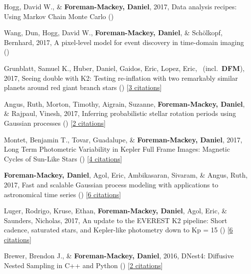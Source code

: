 \item[{\color{numcolor}\scriptsize10}] Hogg, David W., \& \textbf{Foreman-Mackey, Daniel}, 2017, Data analysis recipes: Using Markov Chain Monte Carlo ()

\item[{\color{numcolor}\scriptsize9}] Wang, Dun, Hogg, David W., \textbf{Foreman-Mackey, Daniel}, \& Sch{\"o}lkopf, Bernhard, 2017, A pixel-level model for event discovery in time-domain imaging ()

\item[{\color{numcolor}\scriptsize8}] Grunblatt, Samuel K., Huber, Daniel, Gaidos, Eric, Lopez, Eric, \etal\ (incl.\ \textbf{DFM}), 2017, Seeing double with K2: Testing re-inflation with two remarkably similar planets around red giant branch stars () [\href{http://adsabs.harvard.edu/abs/2017arXiv170605865G}{3 citations}]

\item[{\color{numcolor}\scriptsize7}] Angus, Ruth, Morton, Timothy, Aigrain, Suzanne, \textbf{Foreman-Mackey, Daniel}, \& Rajpaul, Vinesh, 2017, Inferring probabilistic stellar rotation periods using Gaussian processes () [\href{http://adsabs.harvard.edu/abs/2017arXiv170605459A}{2 citations}]

\item[{\color{numcolor}\scriptsize6}] Montet, Benjamin T., Tovar, Guadalupe, \& \textbf{Foreman-Mackey, Daniel}, 2017, Long Term Photometric Variability in Kepler Full Frame Images: Magnetic Cycles of Sun-Like Stars () [\href{http://adsabs.harvard.edu/abs/2017arXiv170507928M}{4 citations}]

\item[{\color{numcolor}\scriptsize5}] \textbf{Foreman-Mackey, Daniel}, Agol, Eric, Ambikasaran, Sivaram, \& Angus, Ruth, 2017, Fast and scalable Gaussian process modeling with applications to astronomical time series () [\href{http://adsabs.harvard.edu/abs/2017arXiv170309710F}{6 citations}]

\item[{\color{numcolor}\scriptsize4}] Luger, Rodrigo, Kruse, Ethan, \textbf{Foreman-Mackey, Daniel}, Agol, Eric, \& Saunders, Nicholas, 2017, An update to the EVEREST K2 pipeline: Short cadence, saturated stars, and Kepler-like photometry down to Kp = 15 () [\href{http://adsabs.harvard.edu/abs/2017arXiv170205488L}{6 citations}]

\item[{\color{numcolor}\scriptsize3}] Brewer, Brendon J., \& \textbf{Foreman-Mackey, Daniel}, 2016, DNest4: Diffusive Nested Sampling in C++ and Python () [\href{http://adsabs.harvard.edu/abs/2016arXiv160603757B}{2 citations}]

